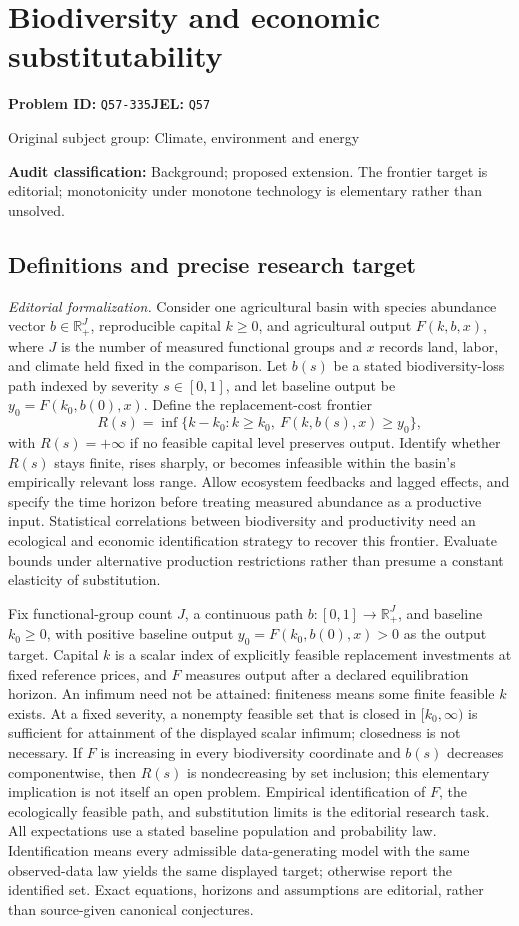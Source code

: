 \documentclass[11pt,a4paper]{article}
\begin{document}
\section*{Biodiversity and economic substitutability}
\textbf{Problem ID:} \texttt{Q57-335}\quad \textbf{JEL:} \texttt{Q57}\par
\label{problem:OP-0436}
{\sffamily\small\color{muted}Original subject group: Climate, environment and energy\par}
\label{definitions:problem:30007718}
\textbf{Audit classification:} Background; proposed extension. The frontier target is editorial; monotonicity under monotone technology is elementary rather than unsolved.
\subsection*{Definitions and precise research target}
\textit{Editorial formalization.} Consider one agricultural basin with species abundance vector \(b\in\mathbb R_+^J\), reproducible capital \(k\geq0\), and agricultural output \(F(k,b,x)\), where \(J\) is the number of measured functional groups and \(x\) records land, labor, and climate held fixed in the comparison. Let \(b(s)\) be a stated biodiversity-loss path indexed by severity \(s\in[0,1]\), and let baseline output be \(y_0=F(k_0,b(0),x)\). Define the replacement-cost frontier
\[R(s)=\inf\{k-k_0:k\geq k_0,\ F(k,b(s),x)\geq y_0\},\]
with \(R(s)=+\infty\) if no feasible capital level preserves output. Identify whether \(R(s)\) stays finite, rises sharply, or becomes infeasible within the basin’s empirically relevant loss range. Allow ecosystem feedbacks and lagged effects, and specify the time horizon before treating measured abundance as a productive input. Statistical correlations between biodiversity and productivity need an ecological and economic identification strategy to recover this frontier. Evaluate bounds under alternative production restrictions rather than presume a constant elasticity of substitution.

Fix functional-group count \(J\), a continuous path \(b:[0,1]\to\mathbb R_+^J\), and baseline \(k_0\geq0\), with positive baseline output \(y_0=F(k_0,b(0),x)>0\) as the output target. Capital \(k\) is a scalar index of explicitly feasible replacement investments at fixed reference prices, and \(F\) measures output after a declared equilibration horizon. An infimum need not be attained: finiteness means some finite feasible \(k\) exists. At a fixed severity, a nonempty feasible set that is closed in \([k_0,\infty)\) is sufficient for attainment of the displayed scalar infimum; closedness is not necessary. If \(F\) is increasing in every biodiversity coordinate and \(b(s)\) decreases componentwise, then \(R(s)\) is nondecreasing by set inclusion; this elementary implication is not itself an open problem. Empirical identification of \(F\), the ecologically feasible path, and substitution limits is the editorial research task. All expectations use a stated baseline population and probability law. Identification means every admissible data-generating model with the same observed-data law yields the same displayed target; otherwise report the identified set. Exact equations, horizons and assumptions are editorial, rather than source-given canonical conjectures.
\end{document}
